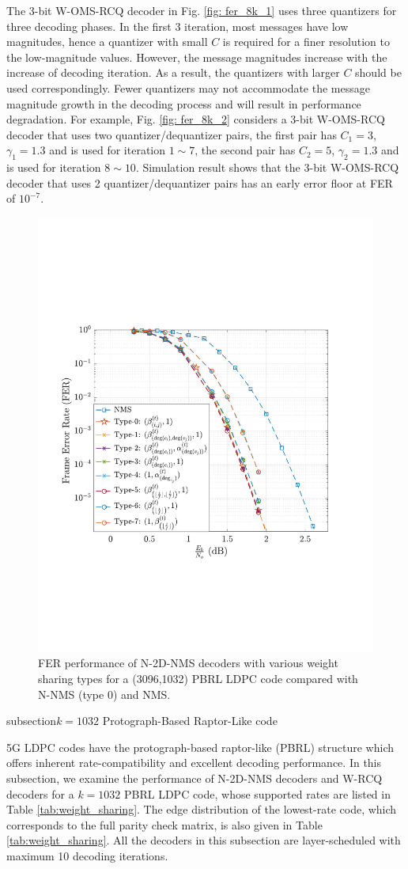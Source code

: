 \documentclass [PhD] {uclathes}
\begin{document}
The 3-bit W-OMS-RCQ decoder in Fig. \ref{fig: fer_8k_1} uses three quantizers for three decoding phases. In the first 3 iteration, most messages have low magnitudes, hence a quantizer with small $C$ is required for a finer resolution to the low-magnitude values. However, the message magnitudes increase with the increase of decoding iteration. As a result, the quantizers with larger $C$ should be used correspondingly. Fewer quantizers may not accommodate the message magnitude growth in the decoding process and will result in performance degradation. For example, Fig. \ref{fig: fer_8k_2} considers a 3-bit W-OMS-RCQ decoder that uses two quantizer/dequantizer pairs, the first pair has $C_1=3$, $\gamma_1=1.3$ and is used for iteration $1\sim7$, the second pair has $C_2=5$, $\gamma_2=1.3$ and is used for iteration $8\sim10$. Simulation result shows that the 3-bit W-OMS-RCQ decoder that uses 2 quantizer/dequantizer pairs has an early error floor at FER of $10^{-7}$.
\begin{figure}[t]
	\centering
	\includegraphics[width=0.5\linewidth]{figures/Fig8_N2DNMS_PBRL.pdf}  
	\caption{FER performance of N-2D-NMS decoders with various weight sharing types for a (3096,1032) PBRL LDPC code compared with N-NMS (type 0) and NMS.}
    \label{fig: FER1}
\end{figure}

subsection{$k=1032$ Protograph-Based Raptor-Like code}

5G LDPC codes have the protograph-based raptor-like (PBRL) \cite{PBRL} structure which offers inherent rate-compatibility and excellent decoding performance. In this subsection, we examine the performance of N-2D-NMS decoders and W-RCQ decoders for a $k=1032$ PBRL LDPC code, whose supported rates are listed in Table \ref{tab:weight_sharing}.  The edge distribution of the lowest-rate code, which corresponds to the full parity check matrix, is also given in Table \ref{tab:weight_sharing}.  All the decoders in this subsection are layer-scheduled with maximum 10 decoding iterations. 
\end{document}
